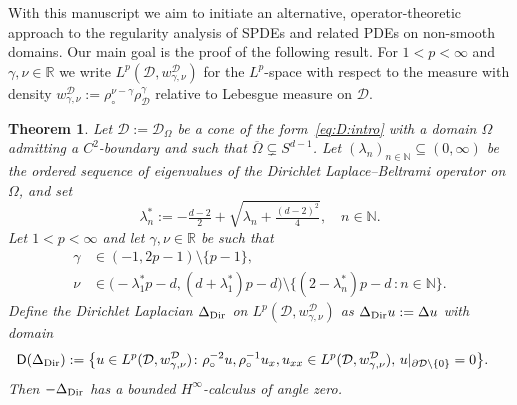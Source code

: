\documentclass[12pt,a4paper, reqno]{amsart}
\theoremstyle{plain}
\newtheorem{TheoremLetter}{Theorem}
\theoremstyle{definition}
\theoremstyle{remark}
\numberwithin{equation}{section}
\newcommand{\1}{\mathbbm{1}}
\newcommand{\R}{\ensuremath{\mathbb{R}}}
\newcommand{\N}{\ensuremath{\mathbb{N}}}
\newcommand{\calD}{\ensuremath{\mathcal{D}}}
\newcommand{\sfD}{\ensuremath{\mathsf{D}}}
\newcommand{\Dir}{\textup{Dir}}
\newcommand{\todoT}[1]{\todo[color=green,inline]{Tobias: #1}}
\begin{document}
With this manuscript we aim to initiate an alternative, operator-theoretic approach to the regularity analysis of SPDEs and related PDEs on non-smooth domains.
Our main goal is the proof of the following result.
For $1<p<\infty$ and $\gamma,\nu\in\R$ we write 
$L^p(\calD,w_{\gamma,\nu}^\calD)$ for the $L^p$-space with respect to the measure with density $w_{\gamma,\nu}^\calD:=\rho_\circ^{\nu-\gamma}\rho_\calD^\gamma$ relative to Lebesgue measure on $\calD$. 
\begin{TheoremLetter}\label{thm:main:Hinf}
Let $\calD:=\calD_\Omega$ be a cone of the form~\eqref{eq:D:intro} with a domain $\Omega$ admitting a $C^2$-boundary and such that $\overline{\Omega}\subsetneq S^{d-1}$. Let $(\lambda_n)_{n\in\N}\subseteq (0,\infty)$ be the ordered sequence of eigenvalues of the Dirichlet Laplace--Beltrami operator on $\Omega$, and set $$\lambda_n^*:= -\tfrac{d-2}{2}+\sqrt{\lambda_n+\tfrac{(d-2)^2}{4}},\quad n\in\N.$$
Let $1<p<\infty$ and let $\gamma,\nu\in\R$ be such that
\begin{align}\label{eq:intro:range:gamma}
\gamma&\in (-1,2p-1)\setminus\{p-1\},    \\
\label{eq:intro:range:nu}
\nu&\in\big(\!-\lambda_1^*p-d,(d+\lambda_1^*)p-d\big)
\setminus
\big\{(2-\lambda_n^*)p-d\,\colon n\in\N  \big\}.
\end{align}
Define the Dirichlet Laplacian $\Delta_\Dir$ on $L^p(\calD,w_{\gamma,\nu}^\calD)$ as $\Delta_\Dir u:=\Delta u$ with domain
\begin{align*}
\sfD(\Delta_\Dir) 
&:=
\big\{u\in L^p(\calD,w_{\gamma,\nu}^\calD)\colon \rho_\circ^{-2} u, \rho_\circ^{-1} u_x,  u_{xx} \in L^p(\calD,w_{\gamma,\nu}^\calD),\,u|_{\partial\calD\setminus\{0\}}=0
\big\}.
\end{align*}
Then $-\Delta_\Dir$ has a bounded $H^\infty$-calculus of angle zero.
\end{TheoremLetter}
\end{document}
